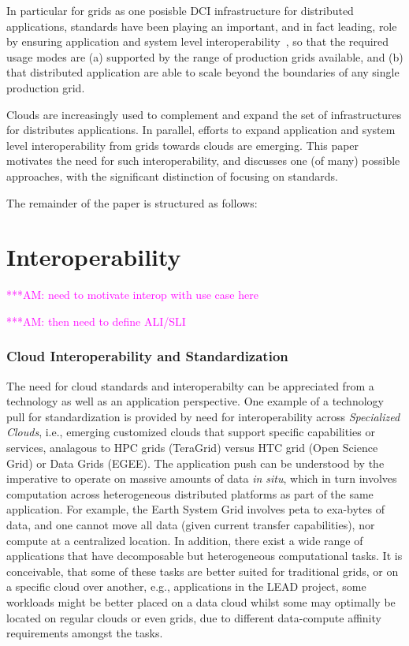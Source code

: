 \documentclass[10pt,conference,final,letterpaper,twoside,twocolumn,]{IEEEtran}
\newcommand{\amnote}[1]{  {\textcolor{magenta} {***AM: #1}}}
\newcommand{\amnote}[1]{}
\begin{document}
 In particular for grids as one posisble DCI infrastructure for
 distributed applications, standards have been playing an important,
 and in fact leading, role by ensuring application and system level
 interoperability~\cite{gin,saga-gin}, so that the required usage
 modes are (a) supported by the range of production grids available,
 and (b) that distributed application are able to scale beyond the
 boundaries of any single production grid.

 Clouds are increasingly used to complement and expand the set of
 infrastructures for distributes applications.  In parallel, efforts
 to expand application and system level interoperability from grids
 towards clouds are emerging.  This paper motivates the need for such
 interoperability, and discusses one (of many) possible approaches,
 with the significant distinction of focusing on standards.

 The remainder of the paper is structured as follows: 


\section{Interoperability}
\label{sec:interop}

 \amnote{need to motivate interop with use case here}

 \amnote{then need to define ALI/SLI}



 \subsubsection*{Cloud Interoperability and Standardization}

 The need for cloud
standards and interoperabilty can be appreciated from a technology as
well as an application perspective. One example of a technology pull
for standardization is provided by need for interoperability across
{\it Specialized Clouds}, i.e., emerging customized clouds that
support specific capabilities or services, analagous to HPC grids
(TeraGrid) versus HTC grid (Open Science Grid) or Data Grids (EGEE).
The application push can be understood by the imperative to operate on
massive amounts of data {\it in situ}, which in turn involves
computation across heterogeneous distributed platforms as part of the
same application.  For example, the Earth System Grid involves peta to
exa-bytes of data, and one cannot move all data (given current
transfer capabilities), nor compute at a centralized location.  In
addition, there exist a wide range of applications that have
decomposable but heterogeneous computational tasks. It is conceivable,
that some of these tasks are better suited for traditional grids, or
on a specific cloud over another, e.g., applications in the LEAD
project, some workloads might be better placed on a data cloud whilst
some may optimally be located on regular clouds or even grids, due to
different data-compute affinity requirements amongst the tasks.
\end{document}
